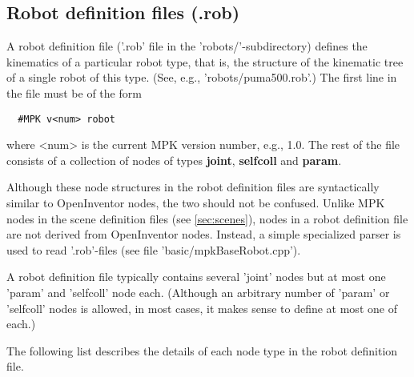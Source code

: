 \documentclass[letter,12pt]{article}
\begin{document}
\subsection{Robot definition files (.rob)}
\label{sec:rob_file}

A robot definition file ('.rob' file in the 'robots/'-subdirectory)
defines the kinematics of a particular robot type, that is, the
structure of the kinematic tree of a single robot of this type.  (See,
e.g., 'robots/puma500.rob'.) The first line in the file must be of the
form
\begin{verbatim}
  #MPK v<num> robot
\end{verbatim}
where <num> is the current MPK version number, e.g., 1.0.  The rest of
the file consists of a collection of nodes of types {\bf joint}, {\bf
  selfcoll} and {\bf param}.

Although these node structures in the robot definition files are
syntactically similar to OpenInventor nodes, the two should not be
confused.  Unlike MPK nodes in the scene definition files (see
\ref{sec:scenes}), nodes in a robot definition file are not derived
from OpenInventor nodes.  Instead, a simple specialized parser is used
to read '.rob'-files (see file 'basic/mpkBaseRobot.cpp').

A robot definition file typically contains several 'joint' nodes but
at most one 'param' and 'selfcoll' node each.  (Although an arbitrary
number of 'param' or 'selfcoll' nodes is allowed, in most cases, it
makes sense to define at most one of each.)

The following list describes the details of each node type in the
robot definition file.
\end{document}
